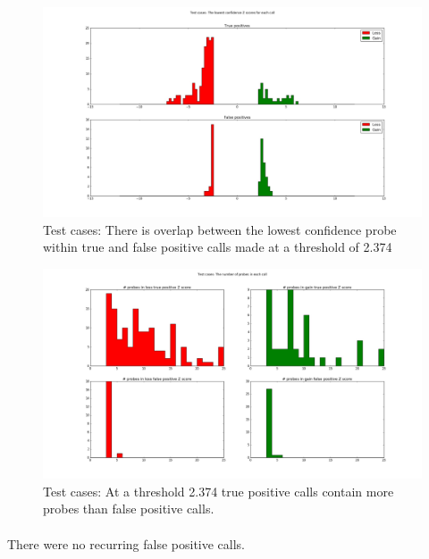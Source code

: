 \begin{figure}
\centering
\includegraphics[width=1\linewidth]{./Figures/testcaseslowestconfidenceZscore}
\caption[Test cases: The lowest confidence probe within calls at a threshold of 2.374]{Test cases: There is overlap between the lowest confidence probe within true and false positive calls made at a threshold of 2.374}
\label{fig:testcaseslowestconfidenceZscore}
\end{figure}

\begin{figure}
\centering
\includegraphics[width=1\linewidth]{./Figures/testcasesprobecount}
\caption[Test cases:  The number of probes within calls made at a threshold of 2.374]{Test cases: At a threshold 2.374 true positive calls contain more probes than false positive calls.}
\label{fig:testcasesprobecount}
\end{figure}

\paragraph*{}
There were no recurring false positive calls.

